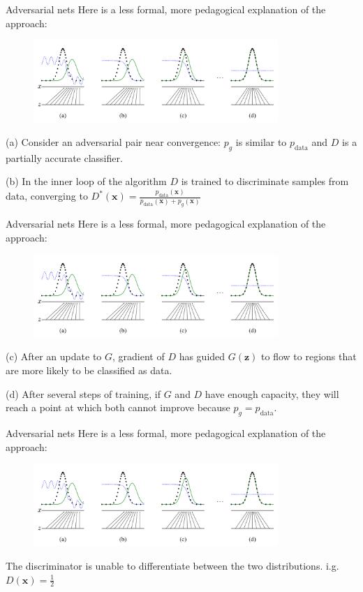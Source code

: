 \documentclass[10pt]{beamer}
\begin{document}
	\begin{frame}[t]{Adversarial nets}
		Here is a less formal, more pedagogical explanation of the approach:
		\begin{figure}
			\includegraphics[width=25em]{figures/GAN-pedagogical-explanation.png}
		\end{figure}
		(a) Consider an adversarial pair near convergence: $p_g$ is similar to $p_{\text{data}}$ and $D$ is a partially accurate classifier.
		
		(b) In the inner loop of the algorithm $D$ is trained to discriminate samples from data, converging to $D^*(\bm{x})=\frac{p_{\text{data}}(\bm{x})}{p_{\text{data}}(\bm{x})+p_g(\bm{x})}$
	\end{frame}

	\begin{frame}[t]{Adversarial nets}
		Here is a less formal, more pedagogical explanation of the approach:
		\begin{figure}
			\includegraphics[width=25em]{figures/GAN-pedagogical-explanation.png}
		\end{figure}
		(c) After an update to $G$, gradient of $D$ has guided $G(\bm{z})$ to flow to regions that are more likely to be classified as data.
		
		(d) After several steps of training, if $G$ and $D$ have enough capacity, they will reach a point at which both cannot improve because $p_g=p_{\text{data}}$.
	\end{frame}

	\begin{frame}[t]{Adversarial nets}
		Here is a less formal, more pedagogical explanation of the approach:
		\begin{figure}
			\includegraphics[width=25em]{figures/GAN-pedagogical-explanation.png}
		\end{figure}
		The discriminator is unable to differentiate between the two distributions. i.g. $D(\bm{x})=\frac{1}{2}$
	\end{frame}
\end{document}
